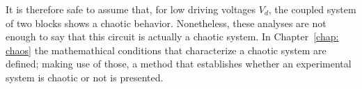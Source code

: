 It is therefore safe to assume that, for low driving voltages $V_d$, the coupled system of two blocks shows a chaotic behavior.
Nonetheless, these analyses are not enough to say that this circuit is actually a chaotic system.
In Chapter~\ref{chap: chaos} the mathemathical conditions that characterize
a chaotic system are defined; making use of those, a method that establishes whether an experimental
system is chaotic or not is presented.



